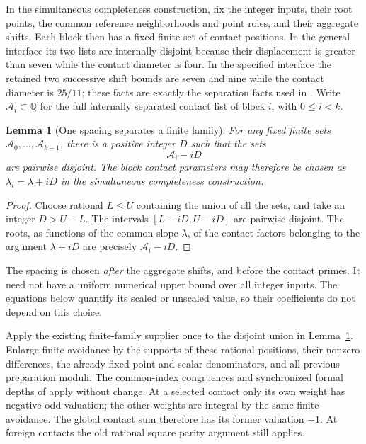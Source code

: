 \documentclass[11pt]{article}
\newtheorem{lemma}[theorem]{Lemma}
\newcommand{\Q}{\mathbb Q}
\begin{document}
In the simultaneous completeness construction, fix the integer inputs,
their root points, the common reference neighborhoods and point roles,
and their aggregate shifts. Each block then has a fixed finite set of
contact positions. In the general interface its two lists are internally
disjoint because their displacement is greater than seven while the
contact diameter is four. In the specified interface the retained two
successive shift bounds are seven and nine while the contact diameter
is $25/11$; these facts are exactly the separation facts used in
\cite{global}. Write $\mathcal A_i\subset\Q$ for the full internally
separated contact list of block $i$, with $0\le i<k$.

\begin{lemma}[One spacing separates a finite family]\label{spacing}
For any fixed finite sets $\mathcal A_0,\ldots,\mathcal A_{k-1}$,
there is a positive integer $D$ such that the sets
\[
                         \mathcal A_i-iD
\]
are pairwise disjoint. The block contact parameters may therefore be
chosen as $\lambda_i=\lambda+iD$ in the simultaneous completeness
construction.
\end{lemma}
\begin{proof}
Choose rational $L\le U$ containing the union of all the sets, and
take an integer $D>U-L$. The intervals
$[L-iD,U-iD]$ are pairwise disjoint. The roots, as functions of the
common slope $\lambda$, of the contact factors belonging to the
argument $\lambda+iD$ are precisely $\mathcal A_i-iD$.
\end{proof}

The spacing is chosen \emph{after} the aggregate shifts, and before
the contact primes. It need not have a uniform numerical upper bound
over all integer inputs. The equations below quantify its scaled or
unscaled value, so their coefficients do not depend on this choice.

Apply the existing finite-family supplier once to the disjoint union
in Lemma~\ref{spacing}. Enlarge finite avoidance by the supports of
these rational positions, their nonzero differences, the already fixed
point and scalar denominators, and all previous preparation moduli.
The common-index congruences and synchronized formal depths of
\cite{global,common} apply without change. At a selected contact only
its own weight has negative odd valuation; the other weights are
integral by the same finite avoidance. The global contact sum therefore
has its former valuation $-1$. At foreign contacts the old rational
square parity argument still applies.
\end{document}
